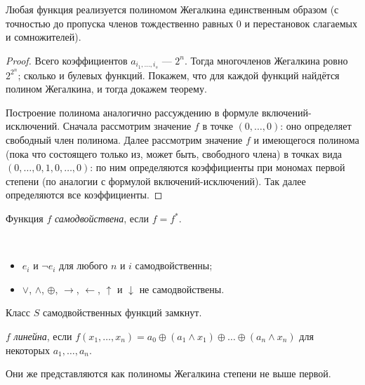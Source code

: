 \documentclass[12pt,a4paper]{article}
\begin{document}
    \begin{theorem}[Жегалкин]
        Любая функция реализуется полиномом Жегалкина единственным образом (с точностью до пропуска членов тождественно равных 0 и перестановок слагаемых и сомножителей). 
    \end{theorem}

    \begin{proof}
        Всего коэффициентов $a_{i_1, \dots, i_s}$ --- $2^n$. Тогда многочленов Жегалкина ровно $2^{2^n}$; сколько и булевых функций. Покажем, что для каждой функций найдётся полином Жегалкина, и тогда докажем теорему.

        Построение полинома аналогично рассуждению в формуле включений-исключений. Сначала рассмотрим значение $f$ в точке $(0, \dots, 0)$: оно определяет свободный член полинома. Далее рассмотрим значение $f$ и имеющегося полинома (пока что состоящего только из, может быть, свободного члена) в точках вида $(0, \dots, 0, 1, 0, \dots, 0)$: по ним определяются коэффициенты при мономах первой степени (по аналогии с формулой включений-исключений). Так далее определяются все коэффициенты.
    \end{proof}

    \begin{definition}
        Функция $f$ \emph{самодвойствена}, если $f=f^*$.
    \end{definition}

    \begin{example}\ 
        \begin{itemize}
            \item $e_i$ и $\neg e_i$ для любого $n$ и $i$ самодвойственны;
            \item $\vee$, $\wedge$, $\oplus$, $\rightarrow$, $\leftarrow$, $\uparrow$ и $\downarrow$ не самодвойствены.
        \end{itemize}
    \end{example}

    \begin{statement}
        Класс $S$ самодвойственных функций замкнут.
    \end{statement}

    \begin{definition}
        $f$ \emph{линейна}, если $f(x_1, \dots, x_n) = a_0 \oplus (a_1 \wedge x_1) \oplus \dots \oplus (a_n \wedge x_n)$ для некоторых $a_1, \dots, a_n$.

        Они же представляются как полиномы Жегалкина степени не выше первой.
    \end{definition}
\end{document}
